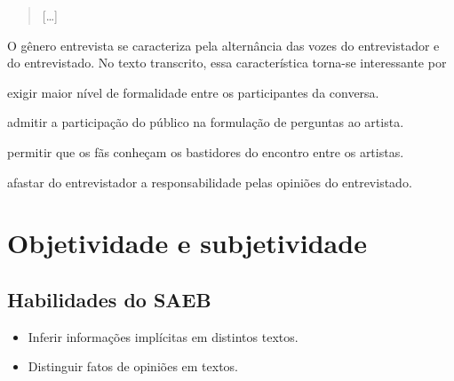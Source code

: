 \begin{quote}
{[}\ldots{]}
\end{quote}


O gênero entrevista se caracteriza pela alternância das vozes do
entrevistador e do entrevistado. No texto transcrito, essa
característica torna-se interessante por

\begin{escolha}
\item exigir maior nível de formalidade entre os participantes da conversa.

\item admitir a participação do público na formulação de perguntas ao
artista.

\item permitir que os fãs conheçam os bastidores do encontro entre os
artistas.

\item afastar do entrevistador a responsabilidade pelas opiniões do
entrevistado.
\end{escolha}

\chapter{Objetividade e subjetividade}

\section{Habilidades do SAEB}

\begin{itemize}
\tightlist
\item
  Inferir informações implícitas em distintos textos.
\item
  Distinguir fatos de opiniões em textos.
\end{itemize}

